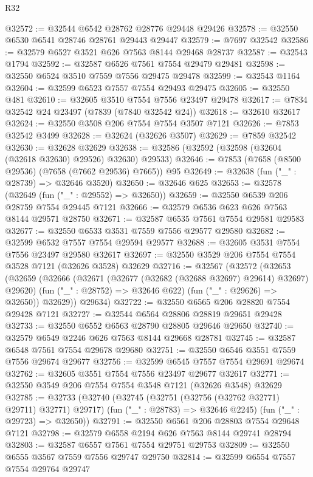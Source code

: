 \begin{lexlean}{R32}
\begin{coremodule}
@32572 := @32544 @6542 @28762 @28776 @29448 @29426
@32578 := @32550 @6530 @6541 @28746 @28761 @29443 @29447
@32579 := @7697 @32542
@32586 := @32579 @6527 @3521 @626 @7563 @8144 @29468 @28737
@32587 := @32543 @1794
@32592 := @32587 @6526 @7561 @7554 @29479 @29481
@32598 := @32550 @6524 @3510 @7559 @7556 @29475 @29478
@32599 := @32543 @1164
@32604 := @32599 @6523 @7557 @7554 @29493 @29475
@32605 := @32550 @481
@32610 := @32605 @3510 @7554 @7556 @23497 @29478
@32617 := @7834 @32542 @24 @23497 (@7839 (@7840 @32542 @24))
@32618 := @32610 @32617
@32624 := @32550 @3508 @206 @7554 @7554 @3507 @7121
@32626 := @7853 @32542 @3499
@32628 := @32624 (@32626 @3507)
@32629 := @7859 @32542
@32630 := @32628 @32629
@32638 := @32586 (@32592 (@32598 (@32604 (@32618 @32630) @29526) @32630) @29533)
@32646 := @7853 (@7658 (@8500 @29536) (@7658 (@7662 @29536) @7665)) @95
@32649 := @32638 (fun ("_" : @28739) => @32646 @3520)
@32650 := @32646 @625
@32653 := @32578 (@32649 (fun ("_" : @29552) => @32650))
@32659 := @32550 @6539 @206 @28759 @7554 @29445 @7121
@32666 := @32579 @6536 @623 @626 @7563 @8144 @29571 @28750
@32671 := @32587 @6535 @7561 @7554 @29581 @29583
@32677 := @32550 @6533 @3531 @7559 @7556 @29577 @29580
@32682 := @32599 @6532 @7557 @7554 @29594 @29577
@32688 := @32605 @3531 @7554 @7556 @23497 @29580 @32617
@32697 := @32550 @3529 @206 @7554 @7554 @3528 @7121 (@32626 @3528) @32629
@32716 := @32567
    (@32572
      (@32653
        (@32659
          (@32666
            (@32671 (@32677 (@32682 (@32688 @32697) @29614) @32697) @29620)
            (fun ("_" : @28752) => @32646 @622)
            (fun ("_" : @29626) => @32650))
          @32629))
      @29634)
@32722 := @32550 @6565 @206 @28820 @7554 @29428 @7121
@32727 := @32544 @6564 @28806 @28819 @29651 @29428
@32733 := @32550 @6552 @6563 @28790 @28805 @29646 @29650
@32740 := @32579 @6549 @2246 @626 @7563 @8144 @29668 @28781
@32745 := @32587 @6548 @7561 @7554 @29678 @29680
@32751 := @32550 @6546 @3551 @7559 @7556 @29674 @29677
@32756 := @32599 @6545 @7557 @7554 @29691 @29674
@32762 := @32605 @3551 @7554 @7556 @23497 @29677 @32617
@32771 := @32550 @3549 @206 @7554 @7554 @3548 @7121 (@32626 @3548) @32629
@32785 := @32733
    (@32740
      (@32745 (@32751 (@32756 (@32762 @32771) @29711) @32771) @29717)
      (fun ("_" : @28783) => @32646 @2245)
      (fun ("_" : @29723) => @32650))
@32791 := @32550 @6561 @206 @28803 @7554 @29648 @7121
@32798 := @32579 @6558 @2194 @626 @7563 @8144 @29741 @28794
@32803 := @32587 @6557 @7561 @7554 @29751 @29753
@32809 := @32550 @6555 @3567 @7559 @7556 @29747 @29750
@32814 := @32599 @6554 @7557 @7554 @29764 @29747

\end{coremodule}
\end{lexlean}
